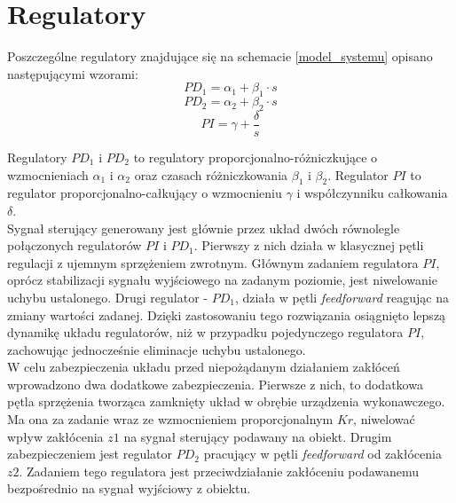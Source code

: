 \section{Regulatory}
Poszczególne regulatory znajdujące się na schemacie \ref{model_systemu} opisano następującymi wzorami: 
\begin{equation}\label{reg1}
PD_1 = \alpha_1+\beta_1 \cdot s
\end{equation}
\begin{equation}\label{reg2}
PD_2 = \alpha_2+\beta_2 \cdot s
\end{equation}
\begin{equation}\label{reg3}
PI = \gamma + \dfrac{\delta}{s}
\end{equation}

Regulatory $PD_1$ i $PD_2$ to regulatory proporcjonalno-różniczkujące o wzmocnieniach $\alpha_1$ i $\alpha_2$ oraz czasach różniczkowania $\beta_1$ i $\beta_2$. Regulator $PI$ to regulator proporcjonalno-całkujący o wzmocnieniu $\gamma$ i współczynniku całkowania $\delta$. \\
Sygnał sterujący generowany jest głównie przez układ dwóch równolegle połączonych regulatorów  $PI$ i $PD_1$. Pierwszy z nich działa w klasycznej pętli regulacji z ujemnym sprzężeniem zwrotnym. Głównym zadaniem regulatora $PI$, oprócz stabilizacji sygnału wyjściowego na zadanym poziomie, jest niwelowanie uchybu ustalonego. Drugi regulator - $PD_1$, działa w pętli \textit{feedforward} reagując na zmiany wartości zadanej. Dzięki zastosowaniu tego rozwiązania osiągnięto lepszą dynamikę układu regulatorów, niż w przypadku pojedynczego regulatora $PI$, zachowując jednocześnie   eliminacje uchybu ustalonego. \\
W celu zabezpieczenia układu przed niepożądanym działaniem zakłóceń wprowadzono dwa dodatkowe zabezpieczenia. Pierwsze z nich, to dodatkowa pętla sprzężenia tworząca zamknięty układ w obrębie urządzenia wykonawczego. Ma ona za zadanie wraz ze wzmocnieniem proporcjonalnym $Kr$, niwelować wpływ zakłócenia $z1$ na sygnał sterujący podawany na obiekt.  Drugim zabezpieczeniem jest regulator $PD_2$ pracujący w pętli \textit{feedforward} od zakłócenia $z2$. Zadaniem tego regulatora jest przeciwdziałanie zakłóceniu podawanemu bezpośrednio na sygnał wyjściowy z obiektu.


